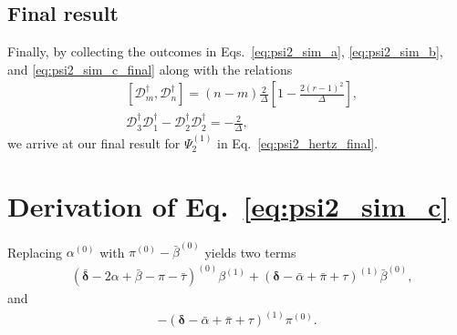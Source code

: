 \documentclass[aps,prd,amsmath,floats,floatfix, twocolumn,
superscriptaddress,nofootinbib,showpacs]{revtex4-1}
\begin{document}
\subsection{Final result}
Finally, by collecting the outcomes in Eqs.~\eqref{eq:psi2_sim_a}, \eqref{eq:psi2_sim_b}, and \eqref{eq:psi2_sim_c_final} along with the relations 
\begin{subequations}
\begin{align}
&\left[\mathcal{D}_{m}^\dagger,\mathcal{D}_{n}^\dagger\right]=(n-m)\frac{2}{\Delta}\left[1-\frac{2(r-1)^2}{\Delta}\right], \label{eq:chandra_D_commutator} \\
&\mathcal{D}_3^\dagger\mathcal{D}_1^\dagger-\mathcal{D}_2^\dagger\mathcal{D}_2^\dagger=-\frac{2}{\Delta},  
\end{align}
\end{subequations}
we arrive at our final result for $\Psi_2^{(1)}$ in Eq.~\eqref{eq:psi2_hertz_final}.

\section{\texorpdfstring{Derivation of Eq.~\eqref{eq:psi2_sim_c}}{Derivation of Equationc}}
\label{app:psi2_sim_c}
Replacing $\alpha^{(0)}$ with $\pi^{(0)}-\bar{\beta}^{(0)}$ yields two terms
\begin{align}
    &(\bm{\bar{\delta}}-2\alpha+\bar{\beta}-\pi-\bar{\tau})^{(0)}\beta^{(1)}+(\bm{\delta}-\bar{\alpha}+\bar{\pi}+\tau)^{(1)}\bar{\beta}^{(0)}, \label{eq:psi2_sim_c1}
\end{align}
and 
\begin{align}
    -(\bm{\delta}-\bar{\alpha}+\bar{\pi}+\tau)^{(1)}\pi^{(0)}. \label{eq:psi2_sim_c2}
\end{align}
\end{document}

